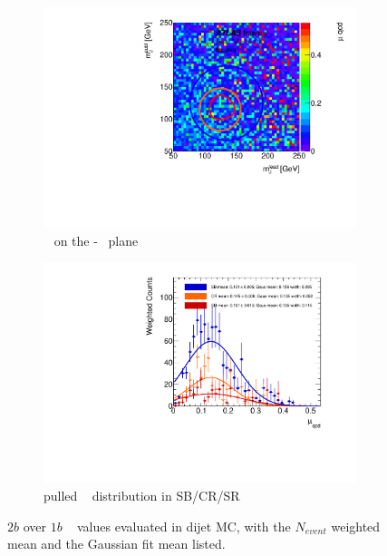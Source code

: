 \begin{figure}[htb!]
\centering
\captionsetup{justification=centering}
	\hspace{-1cm}
    \begin{subfigure}[b]{0.4\textwidth}
        \includegraphics[width=\textwidth,angle=-90]{figures/boosted/AppendixMuqcdstudy/QCD_TwoTag_Incl_mH0H1.pdf}
        \caption{\muqcd~ on the \mleadJ-\msublJ~ plane}
        \label{fig:app-muqcd-2b-2d-qcd}
    \end{subfigure}
    \quad \quad \quad \quad 
    \begin{subfigure}[b]{0.4\textwidth}
        \includegraphics[width=\textwidth,angle=-90]{figures/boosted/AppendixMuqcdstudy/QCD_TwoTag_Incl_mH0H1_pull.pdf}
        \caption{pulled \muqcd~ distribution in SB/CR/SR}
        \label{fig:app-muqcd-2b-pull-qcd}
    \end{subfigure}
\caption{$2b$ over $1b$ \muqcd~ values evaluated in dijet MC, with the $N_{event}$ weighted mean and the Gaussian fit mean listed.}
\label{fig:app-muqcd-2b-qcd}
\end{figure}

